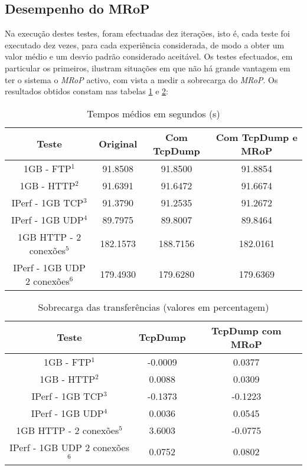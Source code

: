 \subsection{Desempenho do MRoP}


Na execução destes testes, foram efectuadas dez iterações, isto é, cada teste foi executado dez vezes, para cada experiência considerada, de modo a obter um valor médio e um desvio padrão considerado aceitável.
Os testes efectuados, em particular os primeiros, ilustram situações em que não há grande vantagem em ter o sistema o \textit{MRoP} activo, com vista a medir a sobrecarga do \textit{MRoP}.
Os resultados obtidos constam nas tabelas \ref{tab:desempenho} e \ref{tab:overhead}:

\begin{table}[!htb]
\begin{center}
\caption{Tempos médios em segundos (s)}
\begin{tabular}{ | c | c | c | c |  }
\hline
Teste & \hspace {0.3cm} Original \hspace {0.3cm}& \hspace {0.2cm} Com TcpDump \hspace {0.2cm} & Com TcpDump e MRoP \\
\hline
1GB - FTP$^{1}$ & 91.8508	& 91.8500 & 91.8854 \\
1GB - HTTP$^{2}$ & 91.6391 & 91.6472 & 91.6674 \\ 
IPerf - 1GB TCP$^{3}$ & 91.3790	& 91.2535	& 91.2672 \\
IPerf - 1GB UDP$^{4}$ & 89.7975 & 89.8007 & 89.8464 \\
\hline
\hline
1GB HTTP - 2 conexões$^{5}$ & 182.1573 & 188.7156 & 182.0161 \\
IPerf - 1GB UDP 2 conexões$^{6}$ & 179.4930 & 179.6280 & 179.6369 \\
\hline
\end{tabular}
\label{tab:desempenho}
\end{center}
\end{table}

\begin{table}[!htb]
\begin{center}
\caption{Sobrecarga das transferências (valores em percentagem)}
\begin{tabular}{ | c | c | c |}
\hline
Teste & \hspace {0.3cm} TcpDump \hspace {0.3cm} & TcpDump com MRoP  \\

\hline
1GB - FTP$^{1}$ & -0.0009  & 0.0377  \\
1GB - HTTP$^{2}$ & 0.0088 &  0.0309   \\
IPerf - 1GB TCP$^{3}$ & -0.1373 &  -0.1223   \\
IPerf - 1GB UDP$^{4}$ & 0.0036 & 0.0545 \\
\hline
\hline
1GB HTTP - 2 conexões$^{5}$ & 3.6003 & -0.0775   \\
IPerf - 1GB UDP 2 conexões$^{6}$ & 0.0752 & 0.0802   \\
\hline
\end{tabular}
\label{tab:overhead}
\end{center}
\end{table}

